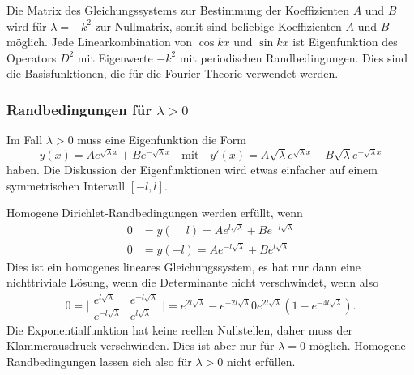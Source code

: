 Die Matrix des Gleichungssystems zur Bestimmung der Koeffizienten $A$ und $B$
wird für $\lambda=-k^2$ zur Nullmatrix, somit sind beliebige Koeffizienten
$A$ und $B$ möglich.
Jede Linearkombination von $\cos kx$ und $\sin kx$ ist Eigenfunktion
des Operators $D^2$ mit Eigenwerte $-k^2$ mit periodischen Randbedingungen.
Dies sind die Basisfunktionen, die für die Fourier-Theorie verwendet
werden.

%
%
\subsubsection{Randbedingungen für $\lambda > 0$}
Im Fall $\lambda >0$ muss eine Eigenfunktion die Form
\[
y(x)
=
Ae^{\!\sqrt{\lambda}x}
+
Be^{-\!\sqrt{\lambda}x}
\quad\text{mit}\quad
y'(x)
=
A\!\sqrt{\lambda}e^{\!\sqrt{\lambda}x}
-
B\!\sqrt{\lambda}e^{-\!\sqrt{\lambda}x}
\]
haben.
Die Diskussion der Eigenfunktionen wird etwas einfacher auf einem
symmetrischen Intervall $[-l,l]$.

Homogene Dirichlet-Randbedingungen werden erfüllt, wenn
\begin{align*}
0&=y(\phantom{-}l) = Ae^{l\!\sqrt{\lambda}} + Be^{-l\!\sqrt{\lambda}}
\\
0&=y(         - l) = Ae^{-l\!\sqrt{\lambda}} + Be^{l\!\sqrt{\lambda}}
\end{align*}
Dies ist ein homogenes lineares Gleichungssystem, es hat nur dann eine
nichttriviale Lösung, wenn die Determinante nicht verschwindet, wenn also
\[
0
=
\biggl|
\begin{matrix}
e^{l\!\sqrt{\lambda}}  & e^{-l\!\sqrt{\lambda}} \\
e^{-l\!\sqrt{\lambda}} & e^{l\!\sqrt{\lambda}}
\end{matrix}
\biggr|
=
e^{2l\!\sqrt{\lambda}} - e^{-2l\!\sqrt{\lambda}}
0
e^{2l\!\sqrt{\lambda}} ( 1 - e^{-4l\!\sqrt{\lambda}}).
\]
Die Exponentialfunktion hat keine reellen Nullstellen, daher
muss der Klammerausdruck verschwinden.
Dies ist aber nur für $\lambda=0$ möglich.
Homogene Randbedingungen lassen sich also für $\lambda>0$ nicht erfüllen.

